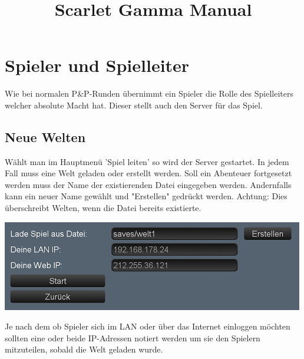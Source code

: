 \documentclass[german,10pt,a4paper,twocolumn,colorscheme=darkblue]{orarticle}
\begin{document}
	\title{Scarlet Gamma Manual}
	\maketitle

	\tableofcontents
	
	\section{Spieler und Spielleiter}
		Wie bei normalen P\&P-Runden übernimmt ein Spieler die Rolle des Spielleiters welcher absolute Macht hat. Dieser stellt auch den Server für das Spiel.
	
		\subsection{Neue Welten}
			Wählt man im Hauptmenü 'Spiel leiten' so wird der Server gestartet. In jedem Fall muss eine Welt geladen oder erstellt werden. Soll ein Abenteuer fortgesetzt werden muss der Name der existierenden Datei eingegeben werden. Andernfalls kann ein neuer Name gewählt und "Erstellen" gedrückt werden. Achtung: Dies überschreibt Welten, wenn die Datei bereits existierte.
			
			\includegraphics[width=\linewidth]{img/launch}
			
			Je nach dem ob Spieler sich im LAN oder über das Internet einloggen möchten sollten eine oder beide IP-Adressen notiert werden um sie den Spielern mitzuteilen, sobald die Welt geladen wurde.
			
\end{document}
